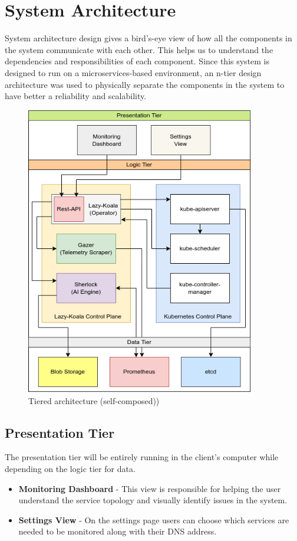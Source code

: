 \section{System Architecture}

System architecture design gives a bird's-eye view of how all the components in the system communicate with each other. This helps us to understand the dependencies and responsibilities of each component. Since this system is designed to run on a microservices-based environment, an n-tier design architecture was used to physically separate the components in the system to have better a reliability and scalability.

\begin{figure}[H]
    \includegraphics[width=10cm]{assets/system-design/tier-architecture.png}
    \caption{Tiered architecture (self-composed))}
    \label{fig:tier-architecture}
\end{figure}

\subsection{Presentation Tier}

The presentation tier will be entirely running in the client's computer while depending on the logic tier for data.

\begin{itemize}[noitemsep,nolistsep] 
    \item \textbf{Monitoring Dashboard} - This view is responsible for helping the user understand the service topology and visually identify issues in the system.
    \item \textbf{Settings View} - On the settings page users can choose which services are needed to be monitored along with their DNS address.
\end{itemize}

